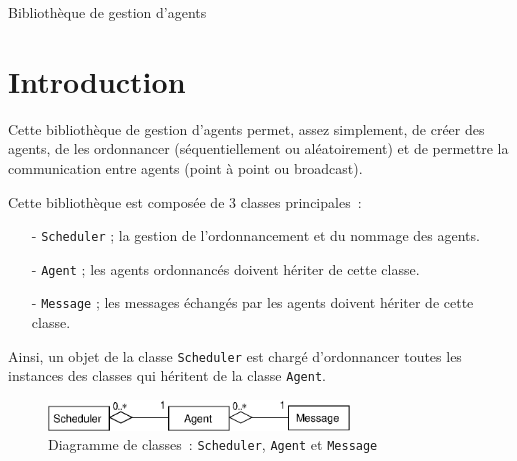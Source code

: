 \documentclass[12pt]{article}
\begin{document}
\begin{LARGE}
\begin{bf}
\begin{center}
Biblioth\`eque de gestion d'agents
\end{center}
\end{bf}
\end{LARGE}

\vspace{-0.4cm}

\section{Introduction}

\vspace{-0.2cm}

Cette biblioth\`eque de gestion d'agents permet, assez simplement, de
cr\'eer des agents, de les ordonnancer (s\'equentiellement ou
al\'eatoirement) et de permettre la communication entre agents
(point \`a point ou broadcast).

\vspace{0.2cm}
Cette biblioth\`eque est compos\'ee de 3 classes principales~:
\begin{itemize}
\vspace{-0.1cm}
\item[-] {\tt Scheduler} ; la gestion de l'ordonnancement et
du nommage des agents.
\vspace{-0.2cm}
\item[-] {\tt Agent} ; les agents ordonnanc\'es doivent h\'eriter de
cette classe.
\vspace{-0.2cm}
\item[-] {\tt Message} ; les messages \'echang\'es par les agents
doivent h\'eriter de cette classe.
\end{itemize}

Ainsi, un objet de la classe {\tt Scheduler} est charg\'e d'ordonnancer toutes
les instances des classes qui h\'eritent de la classe {\tt Agent}.

\vspace{-0.3cm}
\begin{figure}[hbtp]
\begin{center}
\includegraphics[width=8cm]{fig/UML}
\end{center}
\vspace{-0.8cm}
\caption{Diagramme de classes~: {\tt Scheduler}, {\tt Agent} et {\tt Message}}
\end{figure}
\end{document}
